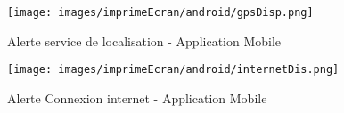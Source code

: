 {\begin{minipage}[c]{.46\linewidth}
\begin{figure}[H]
\centering
\texttt{[image: images/imprimeEcran/android/gpsDisp.png]}
\caption{Alerte service de localisation - Application Mobile}
\end{figure}

 \end{minipage}\hfill
\begin{minipage}[c]{.46\linewidth}
\begin{figure}[H]
\centering
\texttt{[image: images/imprimeEcran/android/internetDis.png]}
\caption{Alerte Connexion internet - Application Mobile}
\end{figure}

\end{minipage}


















}
